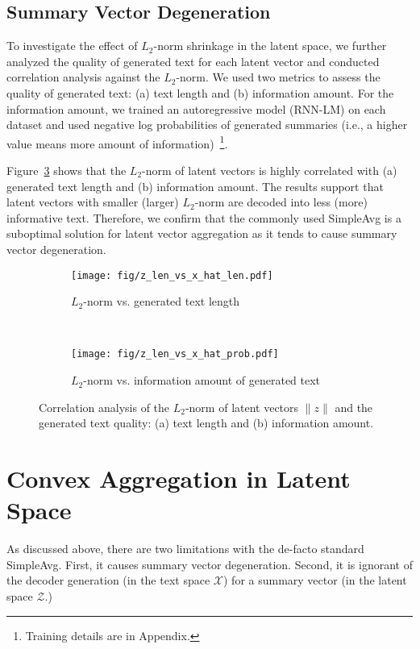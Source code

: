 \documentclass[11pt]{article}
\newcommand{\simpleavg}{\mbox{SimpleAvg}}
\newcommand{\hl}[1]{#1}
\begin{document}
\subsection{Summary Vector Degeneration}
\label{sub:embed_center}

To investigate the effect of $L_2$-norm shrinkage in the latent space, we further analyzed the quality of generated text for each latent vector and conducted correlation analysis against the $L_2$-norm. 
We used two metrics to assess the quality of generated text: (a) text length and (b) information amount. For the information amount, we trained an autoregressive model (RNN-LM) on each dataset and used negative log probabilities of generated summaries (i.e., a higher value means more amount of information)~\cite{brown-etal-1992-estimate,mielke-etal-2019-kind}\footnote{Training details are in Appendix.}.

Figure~\ref{fig:z_analysis} shows that the $L_2$-norm of latent vectors is highly correlated with (a) generated text length and (b) information amount.
The results support that latent vectors with smaller (larger) $L_2$-norm are decoded into less (more) informative text.
Therefore, we confirm that the commonly used \simpleavg{} is a suboptimal solution for latent vector aggregation as it tends to cause
summary vector degeneration.

\begin{figure}[t]
    \centering
    \begin{subfigure}[b]{\linewidth}
        \centering
        \texttt{[image: fig/z\_len\_vs\_x\_hat\_len.pdf]}
        \caption{$L_2$-norm vs. generated text length}
        \label{fig:z_x}
    \end{subfigure}
    ~\hfill
    \begin{subfigure}[b]{\linewidth}
        \centering
        \texttt{[image: fig/z\_len\_vs\_x\_hat\_prob.pdf]}
        \caption{$L_2$-norm vs. information amount of generated text}
        \label{fig:z_prob}
    \end{subfigure}
    \caption{Correlation analysis of the $L_2$-norm of latent vectors $\|z\|$ and the generated text quality: (a) text length and (b) information amount.}
    \label{fig:z_analysis}
\end{figure}

\section{Convex Aggregation in Latent Space}\label{sec:agg}
\hl{As discussed above, there are two limitations} with the de-facto standard \simpleavg. First, it causes summary vector degeneration. Second, it is ignorant of the decoder generation (in the text space $\mathcal{X}$) for a summary vector (in the latent space $\mathcal{Z}$.)
\end{document}
